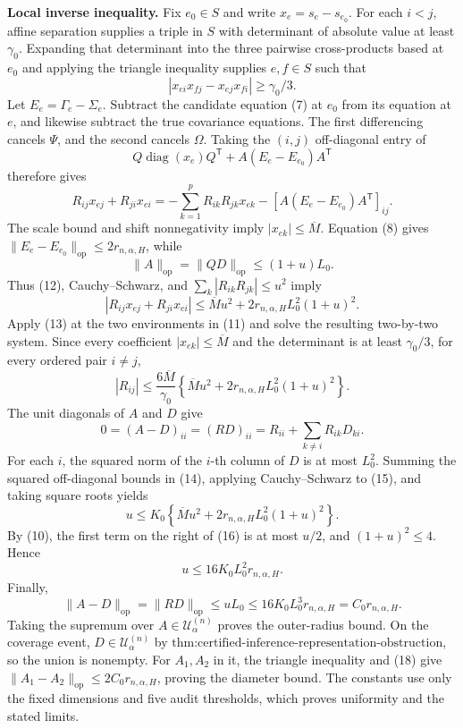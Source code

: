 \textbf{Local inverse inequality.} Fix \(e_0\in S\) and write \(x_e=s_e-s_{e_0}\). For each \(i<j\), affine separation supplies a triple in \(S\) with determinant of absolute value at least \(\gamma_0\). Expanding that determinant into the three pairwise cross-products based at \(e_0\) and applying the triangle inequality supplies \(e,f\in S\) such that
\[
|x_{ei}x_{fj}-x_{ej}x_{fi}|\geq\gamma_0/3.
\tag{11}
\]
Let \(E_e=\Gamma_e-\Sigma_e\). Subtract the candidate equation (7) at \(e_0\) from its equation at \(e\), and likewise subtract the true covariance equations. The first differencing cancels \(\Psi\), and the second cancels \(\Omega\). Taking the \((i,j)\) off-diagonal entry of
\[
Q\operatorname{diag}(x_e)Q^{\mathsf T}
+A(E_e-E_{e_0})A^{\mathsf T}
\]
therefore gives
\[
R_{ij}x_{ej}+R_{ji}x_{ei}
=-\sum_{k=1}^pR_{ik}R_{jk}x_{ek}
-[A(E_e-E_{e_0})A^{\mathsf T}]_{ij}.
\tag{12}
\]
The scale bound and shift nonnegativity imply \(|x_{ek}|\leq\overline M\). Equation (8) gives \(\|E_e-E_{e_0}\|_{\mathrm{op}}\leq2r_{n,\alpha,H}\), while
\[
\|A\|_{\mathrm{op}}=\|QD\|_{\mathrm{op}}
\leq(1+u)L_0.
\]
Thus (12), Cauchy--Schwarz, and \(\sum_k|R_{ik}R_{jk}|\leq u^2\) imply
\[
|R_{ij}x_{ej}+R_{ji}x_{ei}|
\leq\overline M u^2
+2r_{n,\alpha,H}L_0^2(1+u)^2.
\tag{13}
\]
Apply (13) at the two environments in (11) and solve the resulting two-by-two system. Since every coefficient \(|x_{ek}|\leq\overline M\) and the determinant is at least \(\gamma_0/3\), for every ordered pair \(i\neq j\),
\[
|R_{ij}|\leq\frac{6\overline M}{\gamma_0}
\left\{\overline M u^2
+2r_{n,\alpha,H}L_0^2(1+u)^2\right\}.
\tag{14}
\]
The unit diagonals of \(A\) and \(D\) give
\[
0=(A-D)_{ii}=(RD)_{ii}
=R_{ii}+\sum_{k\neq i}R_{ik}D_{ki}.
\tag{15}
\]
For each \(i\), the squared norm of the \(i\)-th column of \(D\) is at most \(L_0^2\). Summing the squared off-diagonal bounds in (14), applying Cauchy--Schwarz to (15), and taking square roots yields
\[
u\leq K_0\left\{\overline M u^2
+2r_{n,\alpha,H}L_0^2(1+u)^2\right\}.
\tag{16}
\]
By (10), the first term on the right of (16) is at most \(u/2\), and \((1+u)^2\leq4\). Hence
\[
u\leq16K_0L_0^2r_{n,\alpha,H}.
\tag{17}
\]
Finally,
\[
\|A-D\|_{\mathrm{op}}
=\|RD\|_{\mathrm{op}}
\leq uL_0
\leq16K_0L_0^3r_{n,\alpha,H}
=C_0r_{n,\alpha,H}.
\tag{18}
\]
Taking the supremum over \(A\in\mathcal U^{(n)}_\alpha\) proves the outer-radius bound. On the coverage event, \(D\in\mathcal U^{(n)}_\alpha\) by \(\text{thm:certified-inference-representation-obstruction}\), so the union is nonempty. For \(A_1,A_2\) in it, the triangle inequality and (18) give \(\|A_1-A_2\|_{\mathrm{op}}\leq2C_0r_{n,\alpha,H}\), proving the diameter bound. The constants use only the fixed dimensions and five audit thresholds, which proves uniformity and the stated limits.